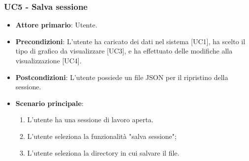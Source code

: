 \subsubsection{UC5 - Salva sessione}
\begin{itemize}
	\item \textbf{Attore primario}: Utente.
	\item \textbf{Precondizioni}: L'utente ha caricato dei dati nel sistema [UC1], ha scelto il tipo di grafico da visualizzare [UC3], e ha effettuato delle modifiche alla visualizzazione [UC4].
	\item \textbf{Postcondizioni}: L'utente possiede un file JSON per il ripristino della sessione.
	\item \textbf{Scenario principale}:
		\begin{enumerate}
			\item L'utente ha una sessione di lavoro aperta.
			\item L'utente seleziona la funzionalità "salva sessione";
			\item L'utente seleziona la directory in cui salvare il file.
		\end{enumerate}
\end{itemize}